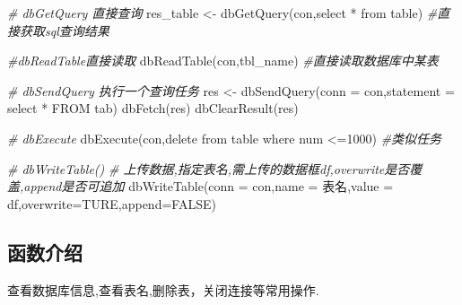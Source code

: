 \documentclass[
]{book}
\newenvironment{Shaded}{\begin{snugshade}}{\end{snugshade}}
\newcommand{\AttributeTok}[1]{\textcolor[rgb]{0.77,0.63,0.00}{#1}}
\newcommand{\CommentTok}[1]{\textcolor[rgb]{0.56,0.35,0.01}{\textit{#1}}}
\newcommand{\ConstantTok}[1]{\textcolor[rgb]{0.00,0.00,0.00}{#1}}
\newcommand{\FunctionTok}[1]{\textcolor[rgb]{0.00,0.00,0.00}{#1}}
\newcommand{\NormalTok}[1]{#1}
\newcommand{\OtherTok}[1]{\textcolor[rgb]{0.56,0.35,0.01}{#1}}
\newcommand{\StringTok}[1]{\textcolor[rgb]{0.31,0.60,0.02}{#1}}
\begin{document}
\begin{Shaded}
\begin{Highlighting}[]
\CommentTok{\# dbGetQuery 直接查询}
\NormalTok{res\_table }\OtherTok{\textless{}{-}} \FunctionTok{dbGetQuery}\NormalTok{(con,}\StringTok{\textquotesingle{}select * from table\textquotesingle{}}\NormalTok{) }\CommentTok{\#直接获取sql查询结果}

\CommentTok{\#dbReadTable直接读取}
\FunctionTok{dbReadTable}\NormalTok{(con,}\StringTok{\textquotesingle{}tbl\_name\textquotesingle{}}\NormalTok{) }\CommentTok{\#直接读取数据库中某表}

\CommentTok{\# dbSendQuery 执行一个查询任务 }
\NormalTok{res }\OtherTok{\textless{}{-}} \FunctionTok{dbSendQuery}\NormalTok{(}\AttributeTok{conn =}\NormalTok{ con,}\AttributeTok{statement =} \StringTok{\textquotesingle{}select * FROM tab\textquotesingle{}}\NormalTok{)}
\FunctionTok{dbFetch}\NormalTok{(res)}
\FunctionTok{dbClearResult}\NormalTok{(res)}

\CommentTok{\# dbExecute}
\FunctionTok{dbExecute}\NormalTok{(con,}\StringTok{\textquotesingle{}delete from table where num \textless{}=1000\textquotesingle{}}\NormalTok{) }\CommentTok{\#类似任务}

\CommentTok{\# dbWriteTable()}
\CommentTok{\# 上传数据,指定表名,需上传的数据框df,overwrite是否覆盖,append是否可追加}
\FunctionTok{dbWriteTable}\NormalTok{(}\AttributeTok{conn =}\NormalTok{ con,}\AttributeTok{name =} \StringTok{\textquotesingle{}表名\textquotesingle{}}\NormalTok{,}\AttributeTok{value =}\NormalTok{ df,}\AttributeTok{overwrite=}\NormalTok{TURE,}\AttributeTok{append=}\ConstantTok{FALSE}\NormalTok{)}
\end{Highlighting}
\end{Shaded}

\hypertarget{ux51fdux6570ux4ecbux7ecd}{%
\subsection{函数介绍}\label{ux51fdux6570ux4ecbux7ecd}}

查看数据库信息,查看表名,删除表，关闭连接等常用操作.
\end{document}
